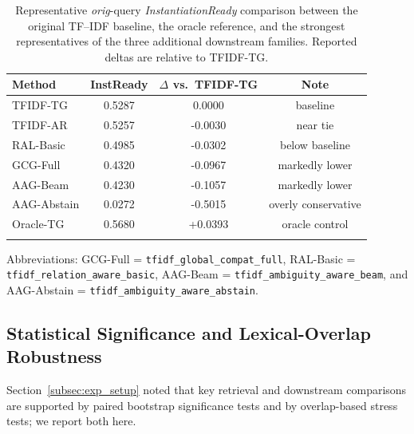\documentclass[pdflatex,sn-basic,Numbered]{sn-jnl}
\begin{document}
\begin{table}[t]
  \centering
  \caption{Representative \emph{orig}-query \textit{InstantiationReady} comparison between the original TF--IDF baseline, the oracle reference, and the strongest representatives of the three additional downstream families. Reported deltas are relative to TFIDF-TG.}
  \label{tab:nlp4lp-newfamily-errorcheck}
  \small
  \setlength{\tabcolsep}{4pt}
  \begin{tabular}{lccc}
    \toprule
    Method & InstReady & $\Delta$ vs.\ TFIDF-TG & Note \\
    \midrule
    TFIDF-TG    & 0.5287 & 0.0000  & baseline \\
    TFIDF-AR    & 0.5257 & -0.0030 & near tie \\
    RAL-Basic   & 0.4985 & -0.0302 & below baseline \\
    GCG-Full    & 0.4320 & -0.0967 & markedly lower \\
    AAG-Beam    & 0.4230 & -0.1057 & markedly lower \\
    AAG-Abstain & 0.0272 & -0.5015 & overly conservative \\
    Oracle-TG   & 0.5680 & +0.0393 & oracle control \\
    \botrule
  \end{tabular}

  \vspace{2mm}
  \raggedright
  \footnotesize
  Abbreviations: GCG-Full = \texttt{tfidf\_global\_compat\_full}, RAL-Basic = \texttt{tfidf\_relation\_aware\_basic}, AAG-Beam = \texttt{tfidf\_ambiguity\_aware\_beam}, and AAG-Abstain = \texttt{tfidf\_ambiguity\_aware\_abstain}.
\end{table}

\subsection{Statistical Significance and Lexical-Overlap Robustness}
\label{subsec:exp_significance}

Section~\ref{subsec:exp_setup} noted that key retrieval and downstream comparisons are supported by paired bootstrap significance tests and by overlap-based stress tests; we report both here.
\end{document}
